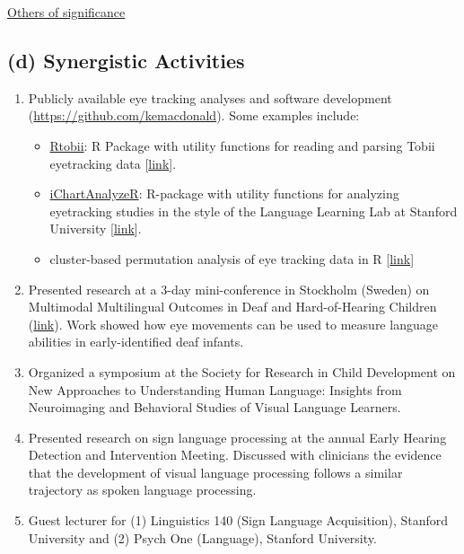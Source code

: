 \documentclass[svgnames,11pt]{article}
\begin{document}



\noindent
\underline{Others of significance}



\subsection*{(d) Synergistic Activities}
\begin{enumerate}

\item Publicly available eye tracking analyses and software development (\href{https://github.com/kemacdonald}{https://github.com/kemacdonald}). Some examples include:
    \begin{itemize}
        \item \underline{Rtobii}: R Package with utility functions for reading and parsing Tobii eyetracking data [\href{https://github.com/kemacdonald/Rtobii}{link}].
        \item \underline{iChartAnalyzeR}: R-package with utility functions for analyzing eyetracking studies in the style of the Language Learning Lab at Stanford University [\href{https://github.com/kemacdonald/iChartAnalyzeR}{link}].
        \item cluster-based permutation analysis of eye tracking data in R [\href{https://kemacdonald.com/materials/cesana-arlotti_cluster_analysis.nb.html}{link}]
    \end{itemize}

\item Presented research at a 3-day mini-conference in Stockholm (Sweden) on Multimodal Multilingual Outcomes in Deaf and Hard-of-Hearing Children (\href{https://www.ntid.rit.edu/mmoworkshop/}{link}). Work showed how eye movements can be used to measure language abilities in early-identified deaf infants.
\item Organized a symposium at the Society for Research in Child Development on New Approaches to Understanding Human Language: Insights from Neuroimaging and Behavioral Studies of Visual Language Learners. 
\item Presented research on sign language processing at the annual Early Hearing Detection and Intervention Meeting. Discussed with clinicians the evidence that the development of visual language processing follows a similar trajectory as spoken language processing.
\item Guest lecturer for (1) Linguistics 140 (Sign Language Acquisition), Stanford University and (2) Psych One (Language), Stanford University.

\end{enumerate}
\end{document}
